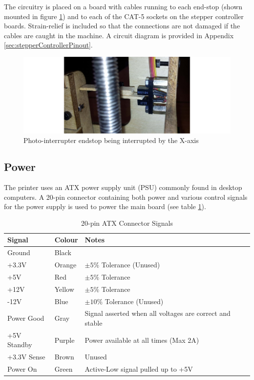 			The circuitry is placed on a board with cables running to each end-stop
			(shown mounted in figure \ref{fig:endstopInstalled}) and to each of the
			CAT-5 sockets on the stepper controller boards. Strain-relief is included
			so that the connections are not damaged if the cables are caught in the
			machine. A circuit diagram is provided in Appendix
			\ref{sec:stepperControllerPinout}.
			
			\begin{figure}
				\includegraphics[width=1\textwidth]{diagrams/endstopInstalled.pdf}
				\caption{Photo-interrupter endstop being interrupted by the X-axis}
				\label{fig:endstopInstalled}
			\end{figure}
			
		\subsection{Power}
			
			The printer uses an ATX power supply unit (PSU) commonly found in
			desktop computers. A 20-pin connector containing both power and various
			control signals for the power supply is used to power the main board
			(see table \ref{tab:atxConnectors}).
			
			\begin{table}[here]
				\centering
				\begin{tabular}{l l l}
					\toprule
					Signal & Colour & Notes\\
					\midrule
					Ground & Black  & \\
					+3.3V  & Orange & $\pm5\%$  Tolerance (Unused) \\
					+5V    & Red    & $\pm5\%$  Tolerance \\
					+12V   & Yellow & $\pm5\%$  Tolerance \\
					-12V   & Blue   & $\pm10\%$ Tolerance (Unused) \\
					\addlinespace
					Power Good  & Gray   & Signal asserted when all voltages are correct
					                       and stable \\
					+5V Standby & Purple & Power available at all times (Max 2A) \\
					+3.3V Sense & Brown  & Unused \\
					Power On    & Green  & Active-Low signal pulled up to +5V \\
					
					\bottomrule
				\end{tabular}
				
				\caption{20-pin ATX Connector Signals\cite{ATX}}
				\label{tab:atxConnectors}
			\end{table}
			
